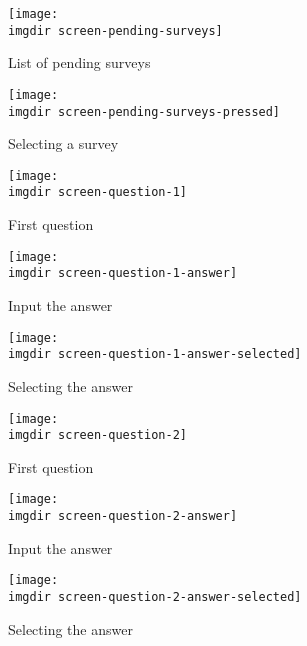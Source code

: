 \begin{figure}
 \centering
 \begin{subfigure}{.3\textwidth}
  \centering
  \texttt{[image: \\imgdir screen-pending-surveys]}
  \caption{List of pending surveys}
  \label{fig:screen-pending-surveys}
\end{subfigure}
\begin{subfigure}{.3\textwidth}
  \centering
  \texttt{[image: \\imgdir screen-pending-surveys-pressed]}
  \caption{Selecting a survey}
  \label{fig:screen-pending-surveys-pressed}
\end{subfigure}
\caption{...}
 \caption{}
\end{figure}


\begin{figure}
 \centering
 \begin{subfigure}{.3\textwidth}
  \centering
  \texttt{[image: \\imgdir screen-question-1]}
  \caption{First question}
  \label{fig:sfig1}
\end{subfigure}
\begin{subfigure}{.3\textwidth}
  \centering
  \texttt{[image: \\imgdir screen-question-1-answer]}
  \caption{Input the answer}
  \label{fig:sfig2}
\end{subfigure}
\begin{subfigure}{.3\textwidth}
  \centering
  \texttt{[image: \\imgdir screen-question-1-answer-selected]}
  \caption{Selecting the answer}
  \label{fig:sfig2}
\end{subfigure}
\caption{...}
 \caption{}
\end{figure}

\begin{figure}
 \centering
 \begin{subfigure}{.3\textwidth}
  \centering
  \texttt{[image: \\imgdir screen-question-2]}
  \caption{First question}
  \label{fig:sfig1}
\end{subfigure}
\begin{subfigure}{.3\textwidth}
  \centering
  \texttt{[image: \\imgdir screen-question-2-answer]}
  \caption{Input the answer}
  \label{fig:sfig2}
\end{subfigure}
\begin{subfigure}{.3\textwidth}
  \centering
  \texttt{[image: \\imgdir screen-question-2-answer-selected]}
  \caption{Selecting the answer}
  \label{fig:sfig2}
\end{subfigure}
\caption{...}
 \caption{}
\end{figure}

